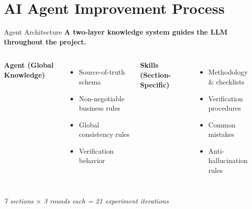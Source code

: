 \section{AI Agent Improvement Process}

\begin{frame}{Agent Architecture}
    \textbf{A two-layer knowledge system guides the LLM throughout the project.}
    \vspace{0.3cm}

    \begin{columns}[T]
        \textbf{Agent (Global Knowledge)}
        \begin{itemize}
            \item Source-of-truth schema
            \item Non-negotiable business rules
            \item Global consistency rules
            \item Verification behavior
        \end{itemize}

        \textbf{Skills (Section-Specific)}
        \begin{itemize}
            \item Methodology \& checklists
            \item Verification procedures
            \item Common mistakes
            \item Anti-hallucination rules
        \end{itemize}
    \end{columns}

    \vspace{0.4cm}
    \centering
    \small\textit{7 sections $\times$ 3 rounds each = 21 experiment iterations}
\end{frame}


